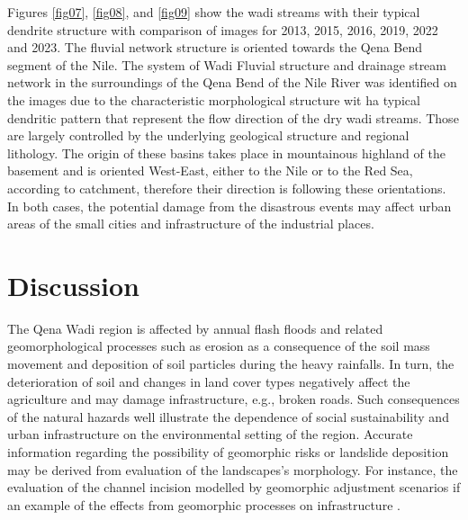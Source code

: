 \documentclass[information,article,submit,pdftex,moreauthors]{Definitions/mdpi}
\begin{document}
Figures \ref{fig07}, \ref{fig08}, and \ref{fig09} show the wadi streams with their typical dendrite structure with comparison of images for 2013, 2015, 2016, 2019, 2022 and 2023. The fluvial network structure is oriented towards the Qena Bend segment of the Nile. The system of Wadi Fluvial structure and drainage stream network in the surroundings of the Qena Bend of the Nile River was identified on the images due to the characteristic morphological structure wit ha typical dendritic pattern that represent the flow direction of the dry wadi streams. Those are largely controlled by the underlying geological structure and regional lithology. The origin of these basins takes place in mountainous highland of the basement and is oriented West-East, either to the Nile or to the Red Sea, according to catchment, therefore their direction is following these orientations. In both cases, the potential damage from the disastrous events may affect urban areas of the small cities and infrastructure of the industrial places. 

\section{Discussion}

The Qena Wadi region is affected by annual flash floods and related geomorphological processes such as erosion as a consequence of the soil mass movement and deposition of soil particles during the heavy rainfalls. In turn, the deterioration of soil and changes in land cover types negatively affect the agriculture and may damage infrastructure, e.g., broken roads. Such consequences of the natural hazards well illustrate the dependence of social sustainability and urban infrastructure on the environmental setting of the region. Accurate information regarding the possibility of geomorphic risks or landslide deposition may be derived from evaluation of the landscapes's morphology. For instance, the evaluation of the channel incision modelled by geomorphic adjustment scenarios if an example of the effects from geomorphic processes on infrastructure \cite{Hermas}.
\end{document}
